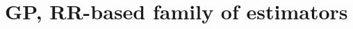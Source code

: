 \documentclass[a4paper,11pt]{article}
\newcommand{\Uspace}{\mathbb{U}}
\theoremstyle{defi}
\numberwithin{thmCounter}{section}
\begin{document}


\newpage
\section{GP, RR-based family of estimators}
\end{document}
